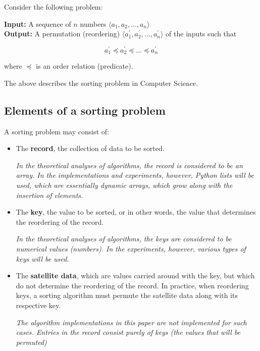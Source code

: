 \documentclass[a4paper]{article}
\begin{document}
        \noindent Consider the following problem:

        \begin{framed}
            {\selectfont
            \noindent\textbf{Input:} A sequence of $n$ numbers $\langle a_1 , a_2 , \dots , a_n  \rangle$ 
            \vspace*{0.25em} \\
            \textbf{Output:} A permutation (reordering) $\langle a_1^{'}, a_2^{'} , \dots , a_n^{'}\rangle$ of the inputs
            such that
             
            \[a_1^{'} \preceq a_2^{'} \preceq \dots \preceq a_n^{'}\]
        
            \noindent where $\preceq$ is an order
            relation (predicate).
            }

        \end{framed}
    \noindent The above describes the sorting problem in Computer Science\supercite{clrs_algorithms}.

    \subsection{Elements of  a sorting problem}
        A sorting problem may consist of\supercite{clrs_algorithms}:
        \begin{itemize}
            \item The \textbf{record}, the collection of data to be sorted.
                    
                \textit{In the theoretical analyses of algorithms, the record is considered to be an array.
                In the implementations and experiments, however, Python lists will be used, which are essentially \emph{dynamic arrays}, which grow along with the insertion of elements.}

            \item The \textbf{key}, the value to be sorted, or in other words, the value that determines the reordering of the record.
            
                \textit{In the theoretical analyses of algorithms, the keys are considered to be numerical values (numbers).
                In the experiments, however, various types of keys will be used.}

            \item The \textbf{satellite data}, which are values carried around with the key,
                but which do not determine the reordering of the record. In practice, when
                reordering keys, a sorting algorithm must permute the satellite data along with
                its respective key.

                \textit{The algorithm implementations in this paper are not implemented for such cases. Entries in the record consist purely of keys (the values that will be permuted)}

        \end{itemize}
\end{document}
